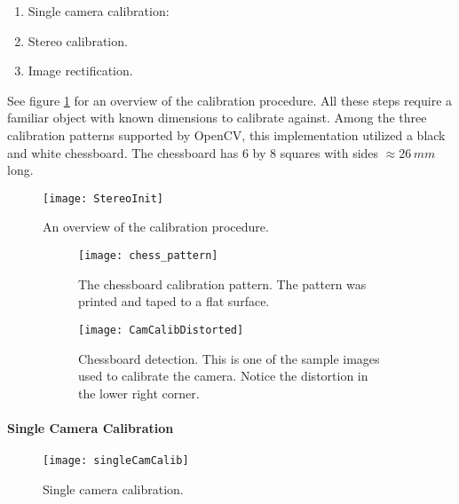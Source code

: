 \begin{enumerate}
	\item Single camera calibration: 
	\item Stereo calibration.
	\item Image rectification.
\end{enumerate}

See figure \ref{fig:calibproc} for an overview of the calibration procedure. All these steps require a familiar object with known dimensions to calibrate against. Among the three calibration patterns supported by OpenCV, this implementation utilized a black and white chessboard. The chessboard has 6 by 8 squares with sides $\approx 26 \, mm$ long.

\begin{figure}
	\texttt{[image: StereoInit]}
	\caption{An overview of the calibration procedure.}
	\label{fig:calibproc}
\end{figure}

\begin{figure}
	\centering
	\begin{subfigure}[b]{0.90\textwidth}
		\texttt{[image: chess\_pattern]}
		\caption{The chessboard calibration pattern. The pattern was printed and taped to a flat surface.}
		\label{fig:chesspattern}
	\end{subfigure}
	\begin{subfigure}[b]{0.90\textwidth}
		\texttt{[image: CamCalibDistorted]}
		\caption{Chessboard detection. This is one of the sample images used to calibrate the camera. Notice the distortion in the lower right corner.}
		\label{fig:chessdetection}
	\end{subfigure}
	\caption{\label{fig:calibrationpattern}}
\end{figure}

\paragraph{Single Camera Calibration}

\begin{wrapfigure}{r}{0.48\textwidth}
	\vspace{-10pt} %
	\centering
	\texttt{[image: singleCamCalib]}
	\caption{\label{fig:singleCamCalib} Single camera calibration.}
	\vspace{-20pt} %
\end{wrapfigure}

